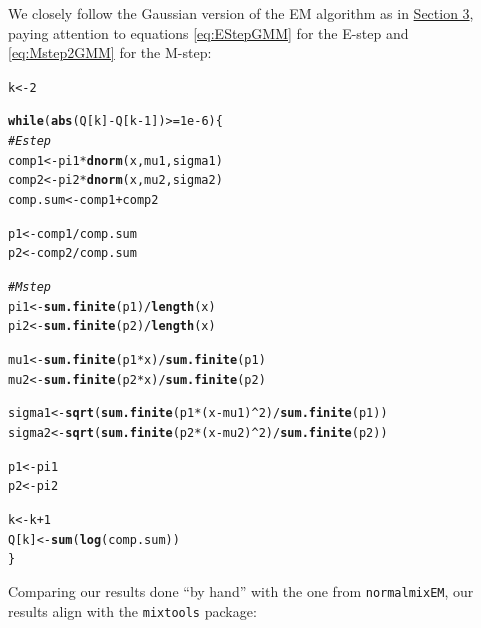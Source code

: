 \documentclass{article}\usepackage[]{graphicx}\usepackage[]{xcolor}
\makeatletter
\newcommand{\hlnum}[1]{\textcolor[rgb]{0.686,0.059,0.569}{#1}}%
\newcommand{\hlcom}[1]{\textcolor[rgb]{0.678,0.584,0.686}{\textit{#1}}}%
\newcommand{\hlopt}[1]{\textcolor[rgb]{0,0,0}{#1}}%
\newcommand{\hlstd}[1]{\textcolor[rgb]{0.345,0.345,0.345}{#1}}%
\newcommand{\hlkwa}[1]{\textcolor[rgb]{0.161,0.373,0.58}{\textbf{#1}}}%
\newcommand{\hlkwb}[1]{\textcolor[rgb]{0.69,0.353,0.396}{#1}}%
\newcommand{\hlkwd}[1]{\textcolor[rgb]{0.737,0.353,0.396}{\textbf{#1}}}%
\newenvironment{kframe}{%
 \def\at@end@of@kframe{}%
 \ifinner\ifhmode%
  \def\at@end@of@kframe{\end{minipage}}%
  \begin{minipage}{\columnwidth}%
 \fi\fi%
 \def\FrameCommand##1{\hskip\@totalleftmargin \hskip-\fboxsep
 \colorbox{shadecolor}{##1}\hskip-\fboxsep
     \hskip-\linewidth \hskip-\@totalleftmargin \hskip\columnwidth}%
 \MakeFramed {\advance\hsize-\width
   \@totalleftmargin\z@ \linewidth\hsize
   \@setminipage}}%
 {\par\unskip\endMakeFramed%
 \at@end@of@kframe}
\newenvironment{knitrout}{}{} %
\theoremstyle{plain}
\theoremstyle{definition}
\theoremstyle{remark}
\makeatother
\begin{document}
We closely follow the Gaussian version of the EM algorithm as in \hyperref[sec:GMMs]{Section 3}, paying attention to equations \eqref{eq:EStepGMM} for the E-step and \eqref{eq:Mstep2GMM} for the M-step: \\
\begin{knitrout}
\color{fgcolor}\begin{kframe}
\begin{alltt}
\hlstd{k} \hlkwb{<-} \hlnum{2}

\hlkwa{while} \hlstd{(}\hlkwd{abs}\hlstd{(Q[k]}\hlopt{-}\hlstd{Q[k}\hlopt{-}\hlnum{1}\hlstd{])}\hlopt{>=}\hlnum{1e-6}\hlstd{) \{}
  \hlcom{# E step}
  \hlstd{comp1} \hlkwb{<-} \hlstd{pi1} \hlopt{*} \hlkwd{dnorm}\hlstd{(x, mu1, sigma1)}
  \hlstd{comp2} \hlkwb{<-} \hlstd{pi2} \hlopt{*} \hlkwd{dnorm}\hlstd{(x, mu2, sigma2)}
  \hlstd{comp.sum} \hlkwb{<-} \hlstd{comp1} \hlopt{+} \hlstd{comp2}

  \hlstd{p1} \hlkwb{<-} \hlstd{comp1}\hlopt{/}\hlstd{comp.sum}
  \hlstd{p2} \hlkwb{<-} \hlstd{comp2}\hlopt{/}\hlstd{comp.sum}

  \hlcom{# M step}
  \hlstd{pi1} \hlkwb{<-} \hlkwd{sum.finite}\hlstd{(p1)} \hlopt{/} \hlkwd{length}\hlstd{(x)}
  \hlstd{pi2} \hlkwb{<-} \hlkwd{sum.finite}\hlstd{(p2)} \hlopt{/} \hlkwd{length}\hlstd{(x)}

  \hlstd{mu1} \hlkwb{<-} \hlkwd{sum.finite}\hlstd{(p1} \hlopt{*} \hlstd{x)} \hlopt{/} \hlkwd{sum.finite}\hlstd{(p1)}
  \hlstd{mu2} \hlkwb{<-} \hlkwd{sum.finite}\hlstd{(p2} \hlopt{*} \hlstd{x)} \hlopt{/} \hlkwd{sum.finite}\hlstd{(p2)}

  \hlstd{sigma1} \hlkwb{<-} \hlkwd{sqrt}\hlstd{(}\hlkwd{sum.finite}\hlstd{(p1} \hlopt{*} \hlstd{(x}\hlopt{-}\hlstd{mu1)}\hlopt{^}\hlnum{2}\hlstd{)} \hlopt{/} \hlkwd{sum.finite}\hlstd{(p1))}
  \hlstd{sigma2} \hlkwb{<-} \hlkwd{sqrt}\hlstd{(}\hlkwd{sum.finite}\hlstd{(p2} \hlopt{*} \hlstd{(x}\hlopt{-}\hlstd{mu2)}\hlopt{^}\hlnum{2}\hlstd{)} \hlopt{/} \hlkwd{sum.finite}\hlstd{(p2))}

  \hlstd{p1} \hlkwb{<-} \hlstd{pi1}
  \hlstd{p2} \hlkwb{<-} \hlstd{pi2}

  \hlstd{k} \hlkwb{<-} \hlstd{k} \hlopt{+} \hlnum{1}
  \hlstd{Q[k]} \hlkwb{<-} \hlkwd{sum}\hlstd{(}\hlkwd{log}\hlstd{(comp.sum))}
\hlstd{\}}
\end{alltt}
\end{kframe}
\end{knitrout}
Comparing our results done ``by hand'' with the one from \texttt{normalmixEM}, our results align with the \texttt{mixtools} package:\\
\end{document}
